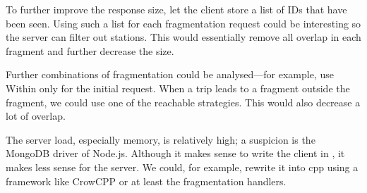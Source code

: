 To further improve the response size, let the client store a list of IDs that have been seen. Using such a list for each fragmentation request could be interesting so the server can filter out stations. This would essentially remove all overlap in each fragment and further decrease the size. 

Further combinations of fragmentation could be analysed—for example, use Within only for the initial request. When a trip leads to a fragment outside the fragment, we could use one of the reachable strategies. This would also decrease a lot of overlap.

The server load, especially memory, is relatively high; a suspicion is the MongoDB driver of Node.js. Although it makes sense to write the client in , it makes less sense for the server. We could, for example, rewrite it into cpp using a framework like CrowCPP \cite{noauthor_crowcpp_nodate} or at least the fragmentation handlers.


